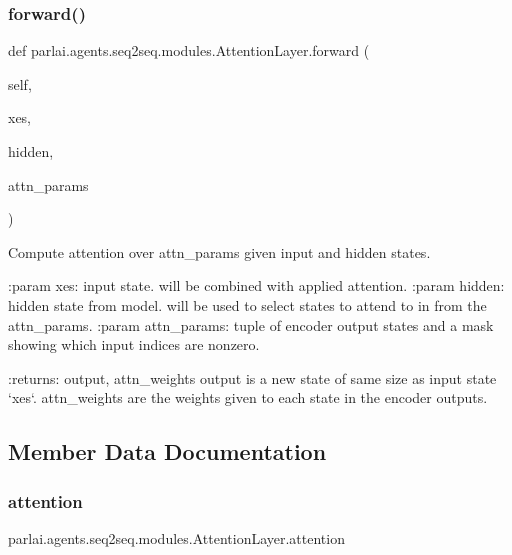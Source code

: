 \subsubsection{\texorpdfstring{forward()}{forward()}}
{\footnotesize\ttfamily def parlai.\+agents.\+seq2seq.\+modules.\+Attention\+Layer.\+forward (\begin{DoxyParamCaption}\item[{}]{self,  }\item[{}]{xes,  }\item[{}]{hidden,  }\item[{}]{attn\+\_\+params }\end{DoxyParamCaption})}

\begin{DoxyVerb}Compute attention over attn_params given input and hidden states.

:param xes:         input state. will be combined with applied
            attention.
:param hidden:      hidden state from model. will be used to select
            states to attend to in from the attn_params.
:param attn_params: tuple of encoder output states and a mask showing
            which input indices are nonzero.

:returns: output, attn_weights
  output is a new state of same size as input state `xes`.
  attn_weights are the weights given to each state in the
  encoder outputs.
\end{DoxyVerb}
 

\subsection{Member Data Documentation}
\mbox{\label{classparlai_1_1agents_1_1seq2seq_1_1modules_1_1AttentionLayer_a8582ed1bb09a75d9a54e812a1b4ae648}} 
\subsubsection{\texorpdfstring{attention}{attention}}
{\footnotesize\ttfamily parlai.\+agents.\+seq2seq.\+modules.\+Attention\+Layer.\+attention}

\mbox{\label{classparlai_1_1agents_1_1seq2seq_1_1modules_1_1AttentionLayer_a5bbb3d93ee56f0a41562141beb302da7}} 
